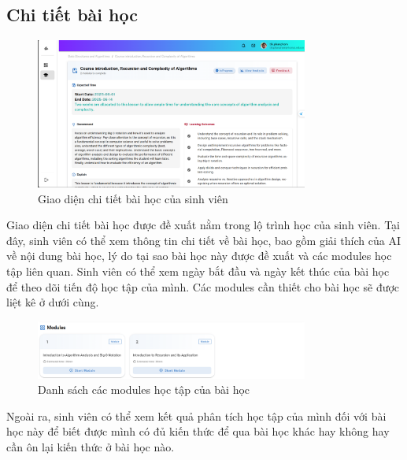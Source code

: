 \subsection{Chi tiết bài học}
\begin{figure}[H]
    \centering
    \includegraphics[width=0.8\textwidth]{images/CapScreen_Student/RecommendLessonDetail.png}
    \caption{Giao diện chi tiết bài học của sinh viên}
    \label{fig:lesson_detail_page}
\end{figure}
Giao diện chi tiết bài học được đề xuất nằm trong lộ trình học của sinh viên. Tại đây, sinh viên có thể xem thông tin chi tiết về bài học, bao gồm giải thích của AI về nội dung bài học, lý do tại sao bài học này được đề xuất và các modules học tập liên quan. Sinh viên có thể xem ngày bắt đầu và ngày kết thúc của bài học để theo dõi tiến độ học tập của mình. Các modules cần thiết cho bài học sẽ được liệt kê ở dưới cùng.

\begin{figure}[H]
    \centering
    \includegraphics[width=0.8\textwidth]{images/CapScreen_Student/ViewModule.png}
    \caption{Danh sách các modules học tập của bài học}
    \label{fig:lesson_detail_page2}
\end{figure}

Ngoài ra, sinh viên có thể xem kết quả phân tích học tập của mình đối với bài học này để biết được mình có đủ kiến thức để qua bài học khác hay không hay cần ôn lại kiến thức ở bài học nào. 
